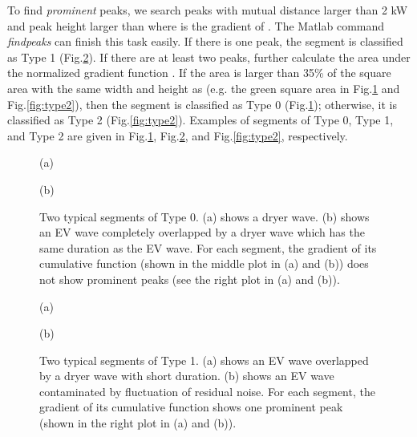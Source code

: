 \documentclass[conference]{IEEEtran}
\begin{document}
To find \emph{prominent} peaks, we search peaks with mutual distance larger than 2 kW and peak height larger than  where  is the gradient of . The Matlab command \emph{findpeaks} can finish this task easily. If there is one peak, the segment is classified as Type 1 (Fig.\ref{fig:type1}). If there are at least two peaks, further calculate the area under the normalized gradient function . If the area is larger than 35\% of the square area with the same width and height as  (e.g. the green square area in Fig.\ref{fig:type0} and Fig.\ref{fig:type2}), then the segment is classified as Type 0 (Fig.\ref{fig:type0}); otherwise, it is classified as Type 2 (Fig.\ref{fig:type2}).  Examples of segments of Type 0, Type 1, and Type 2 are given in Fig.\ref{fig:type0}, Fig.\ref{fig:type1}, and Fig.\ref{fig:type2}, respectively.



\begin{figure}[t]
\begin{minipage}[b]{.48\linewidth}
  \centering
  \centerline{}
  \centerline{\footnotesize{(a)}}
\end{minipage}
\hfill
\begin{minipage}[b]{0.48\linewidth}
  \centering
  \centerline{}
  \centerline{\footnotesize{(b)}}
\end{minipage}
\caption{\footnotesize{Two typical segments of Type 0. (a) shows a dryer wave. (b) shows an EV wave completely overlapped by a dryer wave which has the same duration as the EV wave. For each segment, the gradient of its cumulative function (shown in the middle plot in (a) and (b)) does not show prominent peaks (see the right plot in (a) and (b)).}}
\label{fig:type0}
\end{figure}





\begin{figure}[!t]
\begin{minipage}[b]{.48\linewidth}
  \centering
  \centerline{}
  \centerline{\footnotesize{(a)}}
\end{minipage}
\hfill
\begin{minipage}[b]{0.48\linewidth}
  \centering
  \centerline{}
  \centerline{\footnotesize{(b)}}
\end{minipage}
\caption{\footnotesize{Two typical segments of Type 1. (a) shows an EV wave overlapped by a dryer wave with short duration. (b) shows an EV wave contaminated by fluctuation of residual noise. For each segment, the gradient of its cumulative function shows one prominent peak (shown in the right plot in (a) and (b)).}}
\label{fig:type1}
\end{figure}
\end{document}
